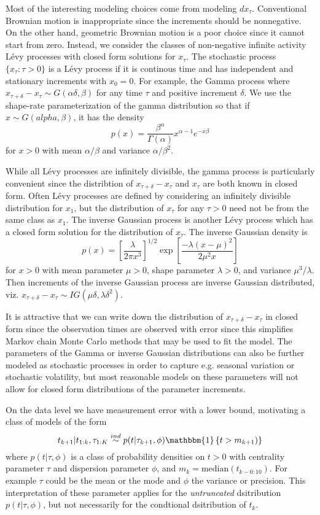 \documentclass{article}
\begin{document}
Most of the interesting modeling choices come from modeling $dx_\tau$. Conventional Brownian motion is inappropriate since the increments should be nonnegative. On the other hand, geometric Brownian motion is a poor choice since it cannot start from zero. Instead, we consider the classes of non-negative infinite activity L\'{e}vy processes with closed form solutions for $x_{\tau}$. The stochastic process $\{x_{\tau}:\tau>0\}$ is a L\'{e}vy process if it is continous time and has independent and stationary increments with $x_0=0$.  For example, the Gamma process where $x_{\tau + \delta} - x_{\tau} \sim G(\alpha \delta, \beta)$ for any time $\tau$ and positive increment $\delta$. We use the shape-rate parameterization of the gamma distribution so that if $x\sim G(alpha,\beta)$, it has the density
\[
p(x) = \frac{\beta^\alpha}{\Gamma(\alpha)}x^{\alpha-1}e^{-x\beta}
\]
for $x>0$ with mean $\alpha/\beta$ and variance $\alpha/\beta^2$. 

While all L\'{e}vy processes are infinitely divisible, the gamma process is particularly convenient since the distribtion of $x_{\tau+\delta} - x_\tau$ and $x_\tau$ are both known in closed form. Often L\'{e}vy processes are defined by considering an infinitely divisible distribution for $x_1$, but the distribution of $x_{\tau}$ for any $\tau>0$ need not be from the same class as $x_1$. The inverse Gaussian process is another L\'{e}vy process which has a closed form solution for the distribution of $x_\tau$. The inverse Gaussian density is
\[
p(x) = \left[\frac{\lambda}{2\pi x^3}\right]^{1/2}\exp\left[\frac{-\lambda(x - \mu)^2}{2\mu^2x}\right]
\]
for $x>0$ with mean parameter $\mu>0$, shape parameter $\lambda>0$, and variance $\mu^3/\lambda$. Then increments of the inverse Gaussian process are inverse Gaussian distributed, viz. $x_{\tau + \delta} - x_\tau \sim IG(\mu\delta,\lambda\delta^2)$. 

It is attractive that we can write down the distribution of $x_{\tau + \delta} - x_\tau$ in closed form since the observation times are observed with error since this simplifies Markov chain Monte Carlo methods that may be used to fit the model. The parameters of the Gamma or inverse Gaussian distributions can also be further modeled as stochastic processes in order to capture e.g. seasonal variation or stochastic volatility, but most reasonable models on these parameters will not allow for closed form distributions of the parameter increments. 

On the data level we have measurement error with a lower bound, motivating a class of models of the form 
\[
t_{k+1} |t_{1:k}, \tau_{1:K} \stackrel{ind}{\sim} p(t|\tau_{k+1}, \phi)\mathbbm{1}\left\{t > m_{k+1})\right\}
\]
where $p(t|\tau,\phi)$ is a class of probability densities on $t>0$ with centrality parameter $\tau$ and dispersion parameter $\phi$, and $m_k = \mathrm{median}(t_{k - 0:10})$. For example $\tau$ could be the mean or the mode and $\phi$ the variance or precision. This interpretation of these parameter applies for the {\it untruncated} dsitribution $p(t|\tau,\phi)$, but not necessarily for the condtional dsitribution of $t_k$.
\end{document}
